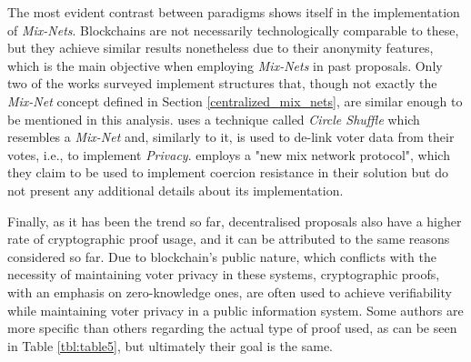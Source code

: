 \documentclass[../access.tex]{subfiles}
\begin{document}
	\par
    The most evident contrast between paradigms shows itself in the implementation of \textit{Mix-Nets}. Blockchains are not necessarily technologically comparable to these, but they achieve similar results nonetheless due to their anonymity features, which is the main objective when employing \textit{Mix-Nets} in past proposals. Only two of the works surveyed implement structures that, though not exactly the \textit{Mix-Net} concept defined in Section \ref{centralized_mix_nets}, are similar enough to be mentioned in this analysis. \cite{Bartolucci2018} uses a technique called \textit{Circle Shuffle} which resembles a \textit{Mix-Net} and, similarly to it, is used to de-link voter data from their votes, i.e., to implement \textit{Privacy}. \cite{Chaieb2020} employs a "new mix network protocol", which they claim to be used to implement coercion resistance in their solution but do not present any additional details about its implementation.
	\par
    Finally, as it has been the trend so far, decentralised proposals also have a higher rate of cryptographic proof usage, and it can be attributed to the same reasons considered so far. Due to blockchain's public nature, which conflicts with the necessity of maintaining voter privacy in these systems, cryptographic proofs, with an emphasis on zero-knowledge ones, are often used to achieve verifiability while maintaining voter privacy in a public information system. Some authors are more specific than others regarding the actual type of proof used, as can be seen in Table \ref{tbl:table5}, but ultimately their goal is the same.
\end{document}
